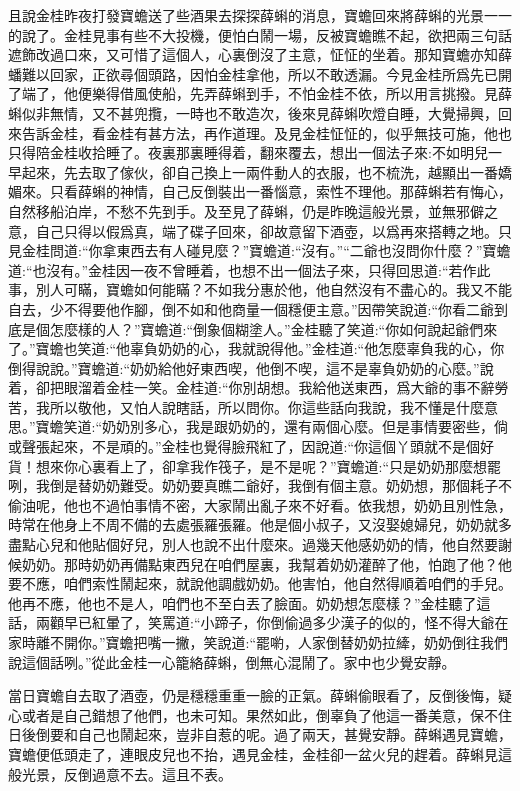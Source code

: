\begin{parag}
    且說金桂昨夜打發寶蟾送了些酒果去探探薛蝌的消息，寶蟾回來將薛蝌的光景一一的說了。金桂見事有些不大投機，便怕白鬧一場，反被寶蟾瞧不起，欲把兩三句話遮飾改過口來，又可惜了這個人，心裏倒沒了主意，怔怔的坐着。那知寶蟾亦知薛蟠難以回家，正欲尋個頭路，因怕金桂拿他，所以不敢透漏。今見金桂所爲先已開了端了，他便樂得借風使船，先弄薛蝌到手，不怕金桂不依，所以用言挑撥。見薛蝌似非無情，又不甚兜攬，一時也不敢造次，後來見薛蝌吹燈自睡，大覺掃興，回來告訴金桂，看金桂有甚方法，再作道理。及見金桂怔怔的，似乎無技可施，他也只得陪金桂收拾睡了。夜裏那裏睡得着，翻來覆去，想出一個法子來:不如明兒一早起來，先去取了傢伙，卻自己換上一兩件動人的衣服，也不梳洗，越顯出一番嬌媚來。只看薛蝌的神情，自己反倒裝出一番惱意，索性不理他。那薛蝌若有悔心，自然移船泊岸，不愁不先到手。及至見了薛蝌，仍是昨晚這般光景，並無邪僻之意，自己只得以假爲真，端了碟子回來，卻故意留下酒壺，以爲再來搭轉之地。只見金桂問道:“你拿東西去有人碰見麼？”寶蟾道:“沒有。”“二爺也沒問你什麼？”寶蟾道:“也沒有。”金桂因一夜不曾睡着，也想不出一個法子來，只得回思道:“若作此事，別人可瞞，寶蟾如何能瞞？不如我分惠於他，他自然沒有不盡心的。我又不能自去，少不得要他作腳，倒不如和他商量一個穩便主意。”因帶笑說道:“你看二爺到底是個怎麼樣的人？”寶蟾道:“倒象個糊塗人。”金桂聽了笑道:“你如何說起爺們來了。”寶蟾也笑道:“他辜負奶奶的心，我就說得他。”金桂道:“他怎麼辜負我的心，你倒得說說。”寶蟾道:“奶奶給他好東西喫，他倒不喫，這不是辜負奶奶的心麼。”說着，卻把眼溜着金桂一笑。金桂道:“你別胡想。我給他送東西，爲大爺的事不辭勞苦，我所以敬他，又怕人說瞎話，所以問你。你這些話向我說，我不懂是什麼意思。”寶蟾笑道:“奶奶別多心，我是跟奶奶的，還有兩個心麼。但是事情要密些，倘或聲張起來，不是頑的。”金桂也覺得臉飛紅了，因說道:“你這個丫頭就不是個好貨！想來你心裏看上了，卻拿我作筏子，是不是呢？”寶蟾道:“只是奶奶那麼想罷咧，我倒是替奶奶難受。奶奶要真瞧二爺好，我倒有個主意。奶奶想，那個耗子不偷油呢，他也不過怕事情不密，大家鬧出亂子來不好看。依我想，奶奶且別性急，時常在他身上不周不備的去處張羅張羅。他是個小叔子，又沒娶媳婦兒，奶奶就多盡點心兒和他貼個好兒，別人也說不出什麼來。過幾天他感奶奶的情，他自然要謝候奶奶。那時奶奶再備點東西兒在咱們屋裏，我幫着奶奶灌醉了他，怕跑了他？他要不應，咱們索性鬧起來，就說他調戲奶奶。他害怕，他自然得順着咱們的手兒。他再不應，他也不是人，咱們也不至白丟了臉面。奶奶想怎麼樣？”金桂聽了這話，兩顴早已紅暈了，笑罵道:“小蹄子，你倒偷過多少漢子的似的，怪不得大爺在家時離不開你。”寶蟾把嘴一撇，笑說道:“罷喲，人家倒替奶奶拉縴，奶奶倒往我們說這個話咧。”從此金桂一心籠絡薛蝌，倒無心混鬧了。家中也少覺安靜。
\end{parag}


\begin{parag}
    當日寶蟾自去取了酒壺，仍是穩穩重重一臉的正氣。薛蝌偷眼看了，反倒後悔，疑心或者是自己錯想了他們，也未可知。果然如此，倒辜負了他這一番美意，保不住日後倒要和自己也鬧起來，豈非自惹的呢。過了兩天，甚覺安靜。薛蝌遇見寶蟾，寶蟾便低頭走了，連眼皮兒也不抬，遇見金桂，金桂卻一盆火兒的趕着。薛蝌見這般光景，反倒過意不去。這且不表。
\end{parag}


